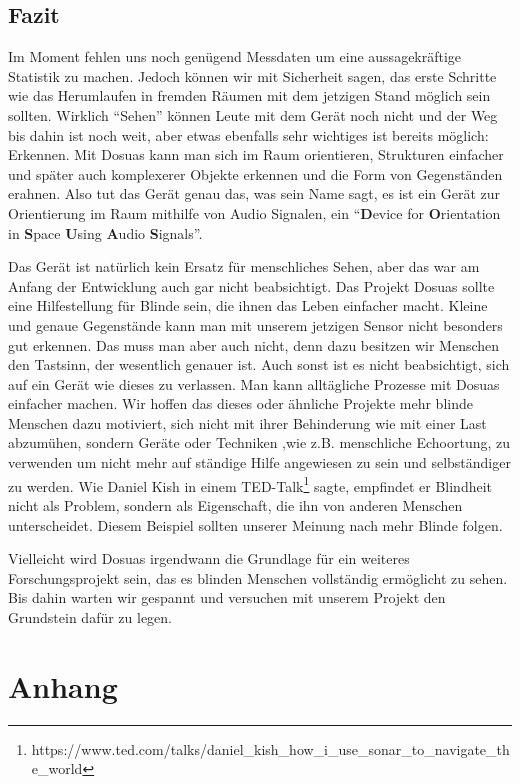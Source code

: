 \documentclass[a4paper,12pt,ngerman]{scrartcl}
\begin{document}
\subsection{Fazit}

Im Moment fehlen uns noch genügend Messdaten um eine aussagekräftige Statistik zu machen. Jedoch
können wir mit Sicherheit sagen, das erste Schritte wie das Herumlaufen in fremden Räumen mit
dem jetzigen Stand möglich sein sollten. Wirklich \enquote{Sehen} können Leute mit dem Gerät
noch nicht und der Weg bis dahin ist noch weit, aber etwas ebenfalls sehr wichtiges
ist bereits möglich: Erkennen. Mit Dosuas kann man sich im Raum orientieren, Strukturen einfacher und später auch komplexerer Objekte erkennen und die Form von Gegenständen erahnen. Also tut das Gerät genau das, was sein Name sagt, es ist ein Gerät zur Orientierung im Raum mithilfe von Audio
Signalen, ein \enquote{\textbf{D}evice for \textbf{O}rientation in \textbf{S}pace \textbf{U}sing 
	\textbf{A}udio \textbf{S}ignals}.\par 
Das Gerät ist natürlich kein Ersatz für menschliches Sehen, aber das war am Anfang der Entwicklung
auch gar nicht beabsichtigt. Das Projekt Dosuas sollte eine Hilfestellung für Blinde sein, die ihnen das Leben einfacher macht. Kleine und genaue Gegenstände kann man mit unserem jetzigen Sensor nicht besonders gut erkennen. Das muss man aber auch nicht, denn dazu besitzen wir Menschen den Tastsinn, der wesentlich genauer ist. Auch sonst ist es nicht beabsichtigt, sich auf 
ein Gerät wie dieses zu verlassen. Man kann alltägliche Prozesse mit Dosuas einfacher machen. 
Wir hoffen das dieses oder ähnliche Projekte mehr blinde Menschen dazu motiviert, sich nicht 
mit ihrer Behinderung wie mit einer Last abzumühen, sondern Geräte oder Techniken
,wie z.B. menschliche Echoortung, zu verwenden um nicht mehr auf ständige Hilfe angewiesen 
zu sein und selbständiger zu werden. Wie Daniel Kish in einem TED-Talk\footnote{https://www.ted.com/talks/daniel\_kish\_how\_i\_use\_sonar\_to\_navigate\_the\_world} sagte, 
empfindet er Blindheit nicht als Problem, sondern als Eigenschaft, die ihn von anderen Menschen
unterscheidet. Diesem Beispiel sollten unserer Meinung nach mehr Blinde folgen.\par 
Vielleicht wird Dosuas irgendwann die Grundlage für ein weiteres
Forschungsprojekt sein, das es blinden Menschen vollständig ermöglicht zu sehen. Bis dahin
warten wir gespannt und versuchen mit unserem Projekt den Grundstein dafür zu legen. 

\newpage

\section{Anhang}
\end{document}
